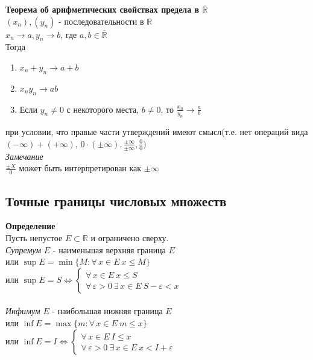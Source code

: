 \documentclass[12pt]{article}
\begin{document}
\textbf{Теорема об арифметических свойствах предела в $\overline{\mathbb{R}}$}\\
$(x_n), (y_n)$ - последовательности в $\mathbb{R}$\\
$x_n\rightarrow a, y_n \rightarrow b$, где $a,b \in \overline{\mathbb{R}}$\\
Тогда
\begin{enumerate}
    \item $x_n+y_n \rightarrow a+b$
    \item $x_ny_n \rightarrow ab$
    \item Если $y_n \neq 0$ с некоторого места, $b\neq 0$, то $\frac{x_n}{y_n} \rightarrow \frac ab$
\end{enumerate}
при условии, что правые части утверждений имеют смысл(т.е. нет операций вида $(-\infty)+(+\infty)$, $0\cdot(\pm\infty), \frac{\pm\infty}{\pm\infty}, \frac 00)$\\
\textit{Замечание}\\
$\frac{\pm X}0$ может быть интерпретирован как $\pm\infty$
\subsection{Точные границы числовых множеств}
\textbf{Определение}\\
Пусть непустое $E \subset \mathbb{R}$ и ограничено сверху.\\
\textit{Супремум} $E$ - наименьшая верхняя граница $E$\\
или $\sup E = \min \{M: \forall\,x\in E\ x\leq M\}$\\
или $\sup E = S \Leftrightarrow \left\{\begin{array}{l}
     \forall\,x\in E\ x\leq S\\
     \forall\,\varepsilon > 0\ \exists\,x\in E\ S-\varepsilon < x 
\end{array}\right.$\\\\
\textit{Инфимум} $E$ - наибольшая нижняя граница $E$\\
или $\inf E = \max \{m: \forall\,x\in E\ m\leq x\}$\\
или $\inf E = I \Leftrightarrow \left\{\begin{array}{l}
     \forall\,x\in E\ I \leq x\\
     \forall\,\varepsilon > 0\ \exists\,x\in E\ x < I+\varepsilon
\end{array}\right.$
\end{document}
